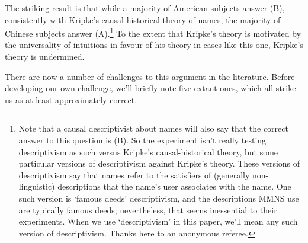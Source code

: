 \noindent The striking result is that while a majority of American subjects answer (B), consistently with Kripke's causal-historical theory of names, the majority of Chinese subjects answer (A).\footnote{Note that a causal descriptivist about names will also say that the correct answer to this question is (B). So the experiment isn't really testing descriptivism as such versus Kripke's causal-historical theory, but some particular versions of descriptivism against Kripke's theory. These versions of descriptivism say that names refer to the satisfiers of (generally non-linguistic) descriptions that the name's user associates with the name. One such version is `famous deeds' descriptivism, and the descriptions MMNS use are typically famous deeds; nevertheless, that seems inessential to their experiments. When we use `descriptivism' in this paper, we'll mean any such version of descriptivism. Thanks here to an anonymous referee.} To the extent that Kripke's theory is motivated by the universality of intuitions in favour of his theory in cases like this one, Kripke's theory is undermined.

There are now a number of challenges to this argument in the literature. Before developing our own challenge, we'll briefly note five extant ones, which all strike us as at least approximately correct.

